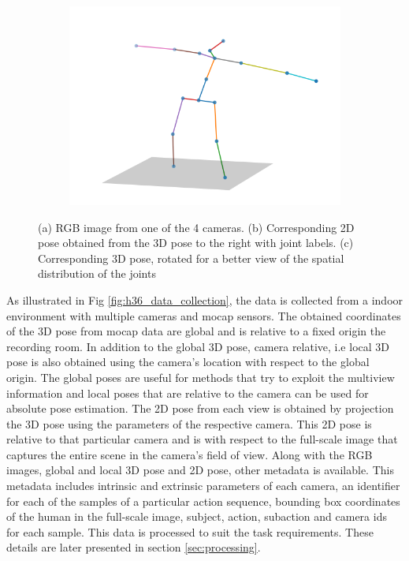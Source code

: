 \begin{figure}
\begin{subfigure}[b]{0.3\textwidth}
        \caption{}
    \end{subfigure}
    \hfill
    \begin{subfigure}[b]{0.3\textwidth}
        \centering
        \includegraphics[width=\textwidth]{figures/h36_viz/h363d.png}
        \caption{}
    \end{subfigure}

    \caption{(a) RGB image from one of the 4 cameras. (b) Corresponding 2D pose obtained from the 3D pose to the right with joint labels. (c) Corresponding 3D pose, rotated for a better view of the spatial distribution of the joints}

    \label{fig:h36_sample}
\end{figure}

As illustrated in Fig \ref{fig:h36_data_collection}, the data is collected from a indoor environment with multiple cameras and \ac{mocap} sensors. The obtained coordinates of the 3D pose from \ac{mocap} data are global and is relative to a fixed origin the recording room. In addition to the global 3D pose, camera relative, i.e local 3D pose is also obtained using the camera's location with respect to the global origin. The global poses are useful for methods that try to exploit the multiview information and local poses that are relative to the camera can be used for absolute pose estimation. The 2D pose from each view is obtained by projection the 3D pose using the parameters of the respective camera. This 2D pose is relative to that particular camera and is with respect to the full-scale image that captures the entire scene in the camera's field of view. Along with the RGB images, global and local 3D pose and 2D pose, other metadata is available. This metadata includes intrinsic and extrinsic parameters of each camera, an identifier for each of the samples of a particular action sequence, bounding box coordinates of the human in the full-scale image, subject, action, subaction and camera ids for each sample. This data is processed to suit the task requirements. These details are later presented in section \ref{sec:processing}.

